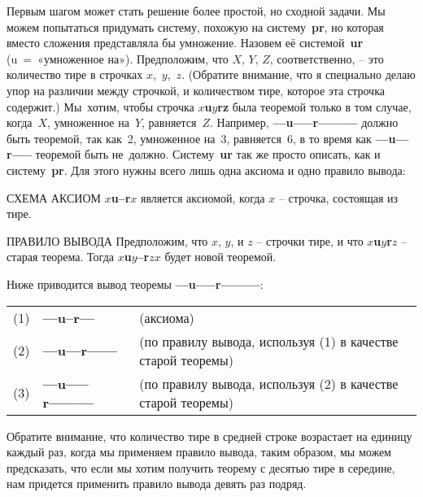 \documentclass[../main.tex]{subfiles}
\begin{document}
Первым шагом может стать решение более простой, но сходной задачи.
Мы можем попытаться придумать систему, похожую на систему~\textbf{pr}, но которая вместо сложения представляла бы умножение.
Назовем её системой~\textbf{ur} (u~=~«умноженное на»).
Предположим, что $X$, $Y$, $Z$, соответственно, \--- это количество тире в строчках $x$,~$y$,~$z$.
(Обратите внимание, что я специально делаю упор на различии между строчкой, и количеством тире, которое эта строчка содержит.)
Мы~хотим, чтобы строчка \textbf{$x$u$y$rz} была теоремой только в том случае, когда~$X$, умноженное на~$Y$, равняется~$Z$.
Например, \textbf{--{}--u--{}--{}--r--{}--{}--{}--{}--{}--} должно быть теоремой, так как~2, умноженное на~3, равняется~6, в то время как \textbf{--{}--u--{}--r--{}--{}--} теоремой быть не~должно.
Систему~\textbf{ur} так же просто описать, как и систему~\textbf{pr}.
Для этого нужны всего лишь одна аксиома и одно правило вывода:

\begin{mybox}{СХЕМА АКСИОМ}
    \textbf{$x$u--r$x$} является аксиомой, когда $x$ \--- строчка, состоящая из тире.
\end{mybox}

\begin{mybox}{ПРАВИЛО ВЫВОДА}
    Предположим, что $x$, $y$, и $z$ \--- строчки тире, и что \textbf{$x$u$y$r$z$} \--- старая теорема.
    Тогда \textbf{$x$u$y$--r$zx$} будет новой теоремой.
\end{mybox}

Ниже приводится вывод теоремы \textbf{--{}--u--{}--{}--r--{}--{}--{}--{}--{}--}:
\begin{center}
\begin{tabular}{r @{~} l @{~~} l}
    (1) & \textbf{--{}--u--r--{}--}
        & (аксиома) \\
    (2) & \textbf{--{}--u--{}--r--{}--{}--{}--}
        & (по правилу вывода, используя (1) в качестве старой теоремы) \\
    (3) & \textbf{--{}--u--{}--{}--r--{}--{}--{}--{}--{}--}
        & (по правилу вывода, используя (2) в качестве старой теоремы) \\
\end{tabular}
\end{center}
Обратите внимание, что количество тире в средней строке возрастает на единицу каждый раз, когда мы применяем правило вывода, таким образом, мы можем предсказать, что если мы хотим получить теорему с десятью тире в середине, нам придется применить правило вывода девять раз подряд.
\end{document}
